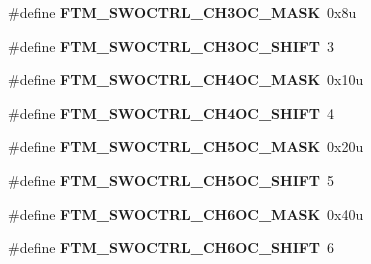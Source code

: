 \begin{DoxyCompactItemize}
\item 
\#define {\bfseries F\+T\+M\+\_\+\+S\+W\+O\+C\+T\+R\+L\+\_\+\+C\+H3\+O\+C\+\_\+\+M\+A\+SK}~0x8u\hypertarget{group__FTM__Register__Masks_ga67e490e5fc532feaba50ac976a8ba91c}{}\label{group__FTM__Register__Masks_ga67e490e5fc532feaba50ac976a8ba91c}

\item 
\#define {\bfseries F\+T\+M\+\_\+\+S\+W\+O\+C\+T\+R\+L\+\_\+\+C\+H3\+O\+C\+\_\+\+S\+H\+I\+FT}~3\hypertarget{group__FTM__Register__Masks_ga1520a6f7f9d94248c38bb2b2a6fdd068}{}\label{group__FTM__Register__Masks_ga1520a6f7f9d94248c38bb2b2a6fdd068}

\item 
\#define {\bfseries F\+T\+M\+\_\+\+S\+W\+O\+C\+T\+R\+L\+\_\+\+C\+H4\+O\+C\+\_\+\+M\+A\+SK}~0x10u\hypertarget{group__FTM__Register__Masks_ga8e7d553c823d031e23a2ca14cef77ed4}{}\label{group__FTM__Register__Masks_ga8e7d553c823d031e23a2ca14cef77ed4}

\item 
\#define {\bfseries F\+T\+M\+\_\+\+S\+W\+O\+C\+T\+R\+L\+\_\+\+C\+H4\+O\+C\+\_\+\+S\+H\+I\+FT}~4\hypertarget{group__FTM__Register__Masks_gaf60fd436bae3cc28d58bdef99ce082c9}{}\label{group__FTM__Register__Masks_gaf60fd436bae3cc28d58bdef99ce082c9}

\item 
\#define {\bfseries F\+T\+M\+\_\+\+S\+W\+O\+C\+T\+R\+L\+\_\+\+C\+H5\+O\+C\+\_\+\+M\+A\+SK}~0x20u\hypertarget{group__FTM__Register__Masks_ga1c11baa172a252f899b39e8c96f8c213}{}\label{group__FTM__Register__Masks_ga1c11baa172a252f899b39e8c96f8c213}

\item 
\#define {\bfseries F\+T\+M\+\_\+\+S\+W\+O\+C\+T\+R\+L\+\_\+\+C\+H5\+O\+C\+\_\+\+S\+H\+I\+FT}~5\hypertarget{group__FTM__Register__Masks_ga10aa816fdf5d6c7759f2343e74dab618}{}\label{group__FTM__Register__Masks_ga10aa816fdf5d6c7759f2343e74dab618}

\item 
\#define {\bfseries F\+T\+M\+\_\+\+S\+W\+O\+C\+T\+R\+L\+\_\+\+C\+H6\+O\+C\+\_\+\+M\+A\+SK}~0x40u\hypertarget{group__FTM__Register__Masks_gae50b63621d0f71b3bc8b19f0fd851815}{}\label{group__FTM__Register__Masks_gae50b63621d0f71b3bc8b19f0fd851815}

\item 
\#define {\bfseries F\+T\+M\+\_\+\+S\+W\+O\+C\+T\+R\+L\+\_\+\+C\+H6\+O\+C\+\_\+\+S\+H\+I\+FT}~6\hypertarget{group__FTM__Register__Masks_ga6440cb11055e9d43b210a2186beff55f}{}\label{group__FTM__Register__Masks_ga6440cb11055e9d43b210a2186beff55f}


\end{DoxyCompactItemize}
